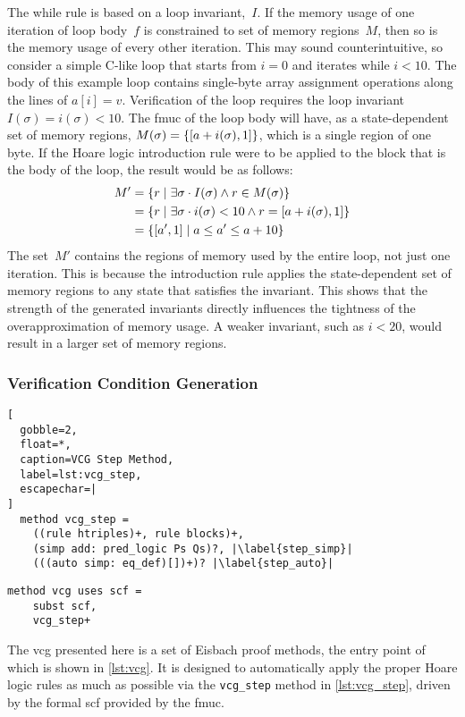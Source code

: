 The while rule is based on a loop invariant,~$I$.
If the memory usage of one iteration of loop body~$f$
is constrained to set of memory regions~$M$,
then so is the memory usage of every other iteration.
This may sound counterintuitive,
so consider a simple C-like loop that starts from $i=0$ and iterates while $i<10$.
The body of this example loop contains single-byte array assignment operations
along the lines of $a[i]=v$.
Verification of the loop requires the loop invariant $I(\sigma)=i(\sigma)<10$.
The \ac{fmuc} of the loop body will have, as a state-dependent set of memory regions, $M(\sigma)=\{[a+i(\sigma),1]\}$, which is a single region of one byte.
If the Hoare logic introduction rule were to be applied to the block
that is the body of the loop, the result would be as follows:
\begin{subequations}
  \begin{align}
    M' &= \{r\mid\exists\sigma\cdot I(\sigma)\wedge r\in M(\sigma)\} \\
    &= \{r\mid\exists\sigma\cdot i(\sigma)<10\wedge r=[a+i(\sigma),1]\} \\
    &= \{[a',1]\mid a\leq a'\le a+10\}
  \end{align}
\end{subequations}
The set~$M'$ contains the regions of memory used by the entire loop,
not just one iteration.
This is because the introduction rule applies the state-dependent set of memory regions
to any state that satisfies the invariant.
This shows that the strength of the generated invariants directly influences the tightness of the overapproximation of memory usage.
A weaker invariant, such as $i<20$, would result in a larger set of memory regions.

\subsubsection{Verification Condition Generation}\label{sse:vcg}
\begin{lstlisting}[
  gobble=2,
  float=*,
  caption=VCG Step Method,
  label=lst:vcg_step,
  escapechar=|
]
  method vcg_step =
    ((rule htriples)+, rule blocks)+,
    (simp add: pred_logic Ps Qs)?, |\label{step_simp}|
    (((auto simp: eq_def)[])+)? |\label{step_auto}|
\end{lstlisting}
\begin{lstlisting}[gobble=2, float=*, caption=Main VCG Method, label=lst:vcg]
  method vcg uses scf =
    subst scf,
    vcg_step+
\end{lstlisting}
The \ac{vcg} presented here is a set of Eisbach proof methods,
the entry point of which is shown in \cref{lst:vcg}.
It is designed to automatically apply the proper Hoare logic rules
as much as possible via the \lstinline|vcg_step| method in \cref{lst:vcg_step},
driven by the formal \ac{scf} provided by the \ac{fmuc}.


